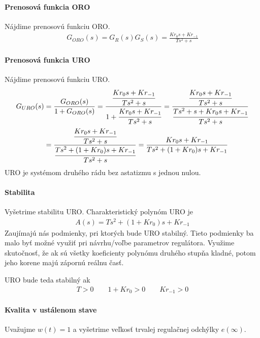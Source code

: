 \documentclass[a4paper, 10pt, ]{article}
\begin{document}
\paragraph{Prenosová funkcia ORO}
Nájdime prenosovú funkciu ORO.
\begin{align}
    G_{ORO}(s) = G_R(s) G_S(s) =  \frac{K r_0 s + Kr_{-1}}{Ts^2+s}
\end{align}

\paragraph{Prenosová funkcia URO}
Nájdime prenosovú funkciu URO.
\begin{align}
    \begin{aligned}
    G_{URO}(s)
    &=  \frac{G_{ORO}(s)}{1+G_{ORO}(s)}
    = \frac{   \cfrac{K r_0 s + Kr_{-1}}{Ts^2+s}   }{   1+  \cfrac{K r_0 s + Kr_{-1}}{Ts^2+s} }
    = \frac{   \cfrac{K r_0 s + Kr_{-1}}{Ts^2+s}   }{   \cfrac{Ts^2+s + K r_0 s + Kr_{-1}}{Ts^2+s} } \\
    &= \frac{   \cfrac{K r_0 s + Kr_{-1}}{Ts^2+s}   }{   \cfrac{Ts^2+  (1 + K r_0) s + Kr_{-1}}{Ts^2+s} }
    = \frac{   K r_0 s + Kr_{-1}   }{   Ts^2+  (1 + K r_0) s + Kr_{-1} }
    \end{aligned}
\end{align}
URO je systémom druhého rádu bez astatizmu s jednou nulou.



\paragraph{Stabilita}

Vyšetrime stabilitu URO. Charakteristický polynóm URO je
\begin{align}
    A(s) = Ts^2+  (1 + K r_0) s + Kr_{-1}
\end{align}
Zaujímajú nás podmienky, pri ktorých bude URO stabilný. Tieto podmienky ba malo byť možné využiť pri návrhu/voľbe parametrov regulátora. Využime skutočnosť, že ak sú všetky koeficienty polynómu druhého stupňa kladné, potom jeho korene majú zápornú reálnu časť.

URO bude teda stabilný ak
\begin{align}
    T>0 \qquad 1+K r_0 >0 \qquad K r_{-1} > 0
\end{align}



\paragraph{Kvalita v ustálenom stave}
Uvažujme $w(t) = 1$ a vyšetrime veľkosť trvalej regulačnej odchýlky $e(\infty)$.
\end{document}
